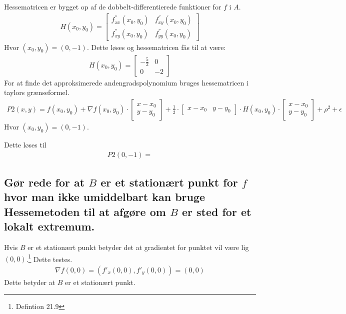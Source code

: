 Hessematricen er bygget op af de dobbelt-differentierede funktioner for $f$ i $A$. 
\begin{align}
    H(x_0,y_0)= 
    \left[
    \begin{array}{cc}
        f^{''}_{xx}(x_0,y_0) & f^{''}_{xy}(x_0,y_0)\\f^{''}_{xy}(x_0,y_0) & f^{''}_{yy}(x_0,y_0)
    \end{array}
\right] 
\end{align}
Hvor $(x_0,y_0)=(0,-1)$.
Dette løses og hessematricen fås til at være:
\begin{align}
    H(x_0,y_0)= 
    \left[
    \begin{array}{cc}
        -\frac{5}{2} & 0\\0 & -2
    \end{array}
\right] 
\end{align}
For at finde det approksimerede andengradspolynomium bruges hessematricen i taylors grænseformel.
\begin{align*}
    P2(x,y)=f(x_0,y_0)+\nabla f(x_0,y_0) \cdot \left[ \begin{array}{c}x-x_0\\ y-y_0 \end{array}\right] + \frac12 \cdot \left[ \begin{array}{cc}x-x_0& y-y_0 \end{array}\right] \cdot H(x_0,y_0) \cdot \left[ \begin{array}{c}x-x_0\\ y-y_0 \end{array}\right]  + \rho ^2 + \epsilon
\end{align*}
Hvor $(x_0,y_0)=(0,-1)$.

Dette løses til
\begin{align}
    P2(0,-1) = 
\end{align}




\subsection{Gør rede for at $B$ er et stationært punkt for $f$ hvor man ikke umiddelbart kan bruge Hessemetoden til at afgøre om $B$ er sted for et lokalt extremum.}

Hvis $B$ er et stationært punkt betyder det at gradientet for punktet vil være lig $(0,0)$.\footnote{Defintion 21.9} Dette testes.
\begin{align}
    \nabla f(0,0) = \left(f'_x(0,0),f'_y(0,0)\right) = (0,0)
\end{align}
Dette betyder at $B$ er et stationært punkt.

